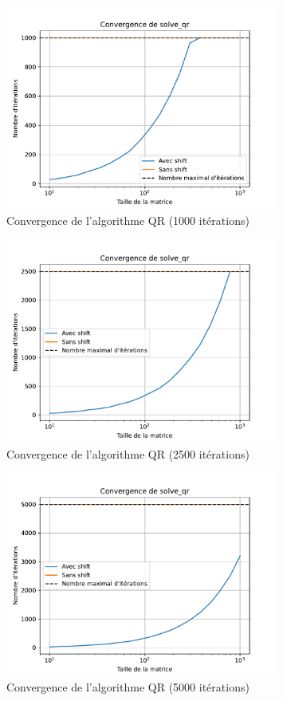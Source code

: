 \documentclass[11pt]{article}
\begin{document}
\begin{figure}[h]
\centering
\includegraphics[width=0.8\textwidth]{images/compare_solve_qr_convergence_1000.pdf}
\caption{Convergence de l'algorithme QR (1000 itérations)}    
\end{figure}

\begin{figure}[h]
\centering
\includegraphics[width=0.8\textwidth]{images/compare_solve_qr_convergence_2500.pdf}
\caption{Convergence de l'algorithme QR (2500 itérations)}    
\end{figure}

\begin{figure}[h]
\centering
\includegraphics[width=0.8\textwidth]{images/compare_solve_qr_convergence_5000.pdf}
\caption{Convergence de l'algorithme QR (5000 itérations)}    
\end{figure}
\end{document}
